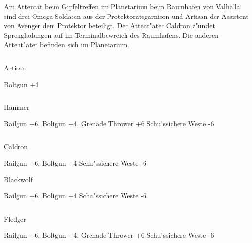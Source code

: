 
Am Attentat beim Gipfeltreffen im Planetarium beim Raumhafen von Valhalla sind drei Omega Soldaten aus der Protektoratsgarnison und Artisan der Assistent von Avenger dem Protektor beteiligt. Der Attent"ater Caldron z"undet Sprengladungen auf im Terminalbewreich des Raumhafens. Die anderen Attent"ater befinden sich im Planetarium.

\begin{column}[l]{0.45}
    \begin{nscsheet}[h]{Artisan}
        \nscstats[ATT=5,AGG=5,EMP=8,KNO=8,HP=12]
        \nscruler
        \begin{nscinventory}
            \nscitem[Waffen] Boltgun +4
        \end{nscinventory}
    \end{nscsheet}
\end{column}
\begin{column}[r]{0.45}
    \begin{nscsheet}[h]{Hammer}
        \nscstats[ATT=8,AGG=8,EMP=1,KNO=2,HP=12]
        \nscruler
        \begin{nscinventory}
            \nscitem[Waffen] Railgun +6, Boltgun +4, Grenade Thrower +6
            \nscitem[R"ustung] Schu"ssichere Weste -6          
        \end{nscinventory}
    \end{nscsheet}
\end{column}
\vfill\pagebreak

\begin{column}[l]{0.45}
    \begin{nscsheet}[h]{Caldron}
        \nscstats[ATT=8,AGG=8,EMP=2,KNO=4,HP=12]
        \nscruler
        \begin{nscinventory}
            \nscitem[Waffen] Railgun +6, Boltgun +4
            \nscitem[R"ustung] Schu"ssichere Weste -6           
        \end{nscinventory}
    \end{nscsheet}

    \begin{nscsheet}[h]{Blackwolf}
        \nscstats[ATT=8,AGG=8,EMP=1,KNO=2,HP=12]
        \nscruler
        \begin{nscinventory}
            \nscitem[Waffen] Railgun +6, Boltgun +4
            \nscitem[R"ustung] Schu"ssichere Weste -6          
        \end{nscinventory}
    \end{nscsheet}    
\end{column}
\begin{column}[r]{0.45}
    \begin{nscsheet}[h]{Fledger}
        \nscstats[ATT=8,AGG=8,EMP=1,KNO=2,HP=12]
        \nscruler
        \begin{nscinventory}
            \nscitem[Waffen] Railgun +6, Boltgun +4, Grenade Thrower +6
            \nscitem[R"ustung] Schu"ssichere Weste -6          
        \end{nscinventory}
    \end{nscsheet}        
\end{column}

